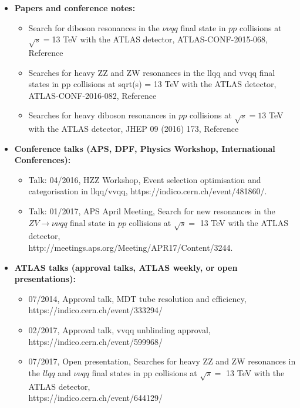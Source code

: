 
\begin{itemize}

\item \textbf{Papers and conference notes:}

    \begin{itemize}
        \item Search for diboson resonances in the $\nu\nu qq$ final state in $pp$ collisions at 
             $\sqrt{s}=$13 TeV with the ATLAS detector, ATLAS-CONF-2015-068, Reference~\cite{ATLAS-CONF-2015-068}
        \item Searches for heavy ZZ and ZW resonances in the llqq and vvqq final states in pp collisions at 
              sqrt(s) = 13 TeV with the ATLAS detector, ATLAS-CONF-2016-082, Reference~\cite{ATLAS-CONF-2016-082}
        \item Searches for heavy diboson resonances in $pp$ collisions at $\sqrt{s}=13$ TeV with the ATLAS detector,
              JHEP 09 (2016) 173,  Reference~\cite{run2-diboson-vvqq}
    \end{itemize}


\item \textbf{Conference talks (APS, DPF, Physics Workshop, International Conferences):}

    \begin{itemize}
        \item Talk: 04/2016, HZZ Workshop, Event selection optimisation and categorisation in llqq/vvqq, https://indico.cern.ch/event/481860/.
        \item Talk: 01/2017, APS April Meeting,  Search for new resonances in the $ ZV \rightarrow \nu\nu qq $ final state in $pp$ collisions at $\sqrt{s}=$ 13 TeV with the ATLAS detector, \\
           http://meetings.aps.org/Meeting/APR17/Content/3244.
    \end{itemize}


\item \textbf{ATLAS talks (approval talks, ATLAS weekly, or open presentations):}

    \begin{itemize}
        \item 07/2014,  Approval talk, MDT tube resolution and efficiency, https://indico.cern.ch/event/333294/
        \item 02/2017, Approval talk, vvqq unblinding approval, https://indico.cern.ch/event/599968/
        \item 07/2017, Open presentation,  Searches for heavy ZZ and ZW resonances in the $llqq$ and $\nu\nu qq$ final states in pp collisions at $\sqrt{s}=$ 13 TeV with the ATLAS detector, \\
        https://indico.cern.ch/event/644129/
    \end{itemize}


\end{itemize}

